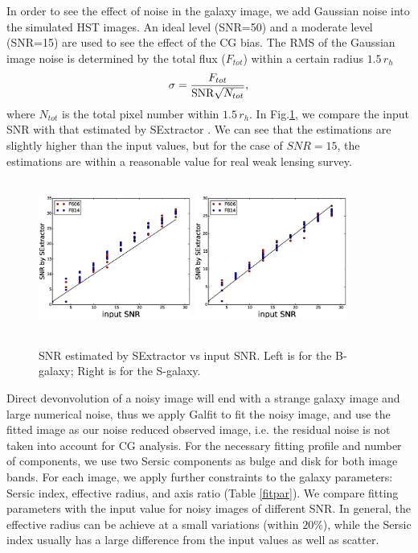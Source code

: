 \documentclass[useAMS,usenatbib]{mn2e}
\newcommand{\be}{\begin{equation}}
\newcommand{\ee}{\end{equation}}
\begin{document}
In order to see the effect of noise in the galaxy image, we add
Gaussian noise into the simulated HST images. An ideal level (SNR=50)
and a moderate level (SNR=15) are used to see the effect of the CG
bias. The RMS of the Gaussian image noise is determined by the total
flux ($F_{tot}$) within a certain radius $1.5\,r_h$
%
\be
\sigma = {F_{tot} \over {\rm SNR} \sqrt{N_{tot}} },
\ee
%
where $N_{tot}$ is the total pixel number within $1.5\,r_h$.  In
Fig.\ref{fig:ests2n}, we compare the input SNR with that estimated by
SExtractor \citep{1996A&AS..117..393B}. We can see that the
estimations are slightly higher than the input values, but for the
case of $SNR=15$, the estimations are within a reasonable value for
real weak lensing survey.
%
\begin{figure}
\centerline{\includegraphics[height=5cm,width=5.0cm]{zs2ncB.eps}
\includegraphics[height=5cm,width=5.0cm]{zs2ncS.eps}}
\caption{SNR estimated by SExtractor vs input SNR. Left is for the
  B-galaxy; Right is for the S-galaxy.}
\label{fig:ests2n}
\end{figure}
%

Direct devonvolution of a noisy image will end with a strange galaxy
image and large numerical noise, thus we apply Galfit
\citep{2010AJ....139.2097P} to fit the noisy image, and use the fitted
image as our noise reduced observed image, i.e. the residual noise is
not taken into account for CG analysis. For the necessary fitting
profile and number of components, we use two Sersic components as
bulge and disk for both image bands. For each image, we apply further
constraints to the galaxy parameters: Sersic index, effective radius,
and axis ratio (Table \ref{fitpar}). We compare fitting parameters
with the input value for noisy images of different SNR. In general,
the effective radius can be achieve at a small variations (within
$20\%$), while the Sersic index usually has a large difference from
the input values as well as scatter.
\end{document}
